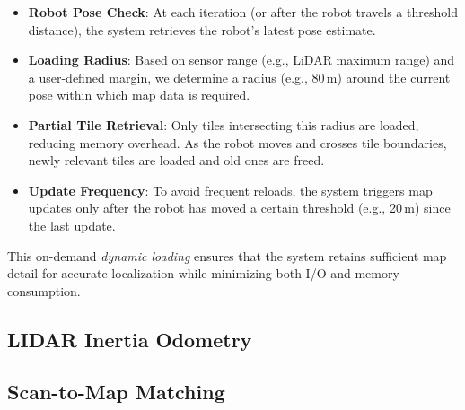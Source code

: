 \begin{itemize}
    \item \textbf{Robot Pose Check}: At each iteration (or after the robot travels a threshold distance), the system retrieves the robot's latest pose estimate.
    \item \textbf{Loading Radius}: Based on sensor range (e.g., LiDAR maximum range) and a user-defined margin, we determine a radius (e.g., 80\,m) around the current pose within which map data is required.
    \item \textbf{Partial Tile Retrieval}: Only tiles intersecting this radius are loaded, reducing memory overhead. As the robot moves and crosses tile boundaries, newly relevant tiles are loaded and old ones are freed.
    \item \textbf{Update Frequency}: To avoid frequent reloads, the system triggers map updates only after the robot has moved a certain threshold (e.g., 20\,m) since the last update.
\end{itemize}

This on-demand \emph{dynamic loading} ensures that the system retains sufficient map detail for accurate localization while minimizing both I/O and memory consumption. 

\subsection{LIDAR Inertia Odometry}

\subsection{Scan-to-Map Matching}

\subsubsection{}





